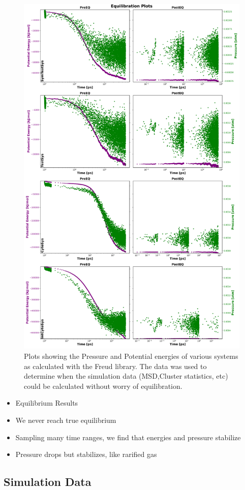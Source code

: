 \documentclass{article}
\begin{document}
\begin{figure}[!htbp]
\centering
\includegraphics[width=0.7\linewidth]{files/Fig3-c8f52112ab9c36b95917d32f74d7df9b.png}
\caption[]{Plots showing the Pressure and Potential energies of various systems as calculated with the Freud library. The data was used to determine when the simulation data (MSD,Cluster statistics, etc) could be calculated without worry of equilibration.}
\label{Fig3_EQ}
\end{figure}

\begin{itemize}
\item Equilibrium Results
\end{itemize}

\begin{itemize}
\item We never reach true equilibrium
\item Sampling many time ranges, we find that energies and pressure stabilize
\item Pressure drops but stabilizes, like rarified gas
\end{itemize}

\subsection{Simulation Data}
\end{document}
